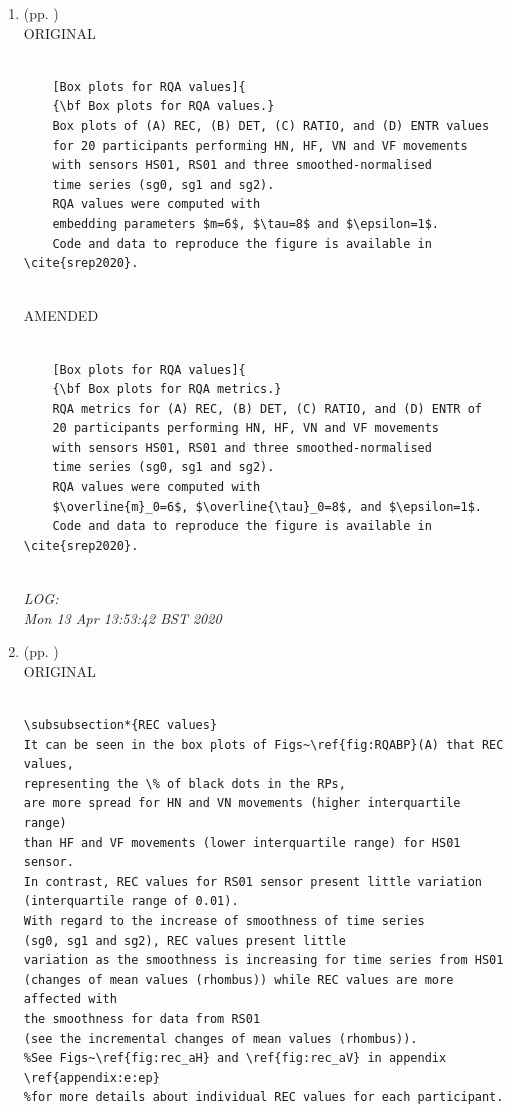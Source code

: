 \documentclass[10pt]{article}
\begin{document}
\begin{enumerate}
\item  (pp. ) \\
ORIGINAL
\begin{verbatim}

	[Box plots for RQA values]{
	{\bf Box plots for RQA values.}
	Box plots of (A) REC, (B) DET, (C) RATIO, and (D) ENTR values 
	for 20 participants performing HN, HF, VN and VF movements
	with sensors HS01, RS01 and three smoothed-normalised  
	time series (sg0, sg1 and sg2).
	RQA values were computed with 
	embedding parameters $m=6$, $\tau=8$ and $\epsilon=1$.
	Code and data to reproduce the figure is available in \cite{srep2020}.
 

\end{verbatim}

AMENDED
\begin{verbatim}

	[Box plots for RQA values]{
	{\bf Box plots for RQA metrics.}
	RQA metrics for (A) REC, (B) DET, (C) RATIO, and (D) ENTR of 
	20 participants performing HN, HF, VN and VF movements
	with sensors HS01, RS01 and three smoothed-normalised  
	time series (sg0, sg1 and sg2).
	RQA values were computed with 
	$\overline{m}_0=6$, $\overline{\tau}_0=8$, and $\epsilon=1$. 
	Code and data to reproduce the figure is available in \cite{srep2020}.
 

\end{verbatim}

\textit{
LOG: \\ 
Mon 13 Apr 13:53:42 BST 2020
}
\\




\item  (pp. ) \\
ORIGINAL
\begin{verbatim}
 
\subsubsection*{REC values}
It can be seen in the box plots of Figs~\ref{fig:RQABP}(A) that REC values, 
representing the \% of black dots in the RPs, 
are more spread for HN and VN movements (higher interquartile range) 
than HF and VF movements (lower interquartile range) for HS01 sensor. 
In contrast, REC values for RS01 sensor present little variation 
(interquartile range of 0.01).
With regard to the increase of smoothness of time series 
(sg0, sg1 and sg2), REC values present little 
variation as the smoothness is increasing for time series from HS01 
(changes of mean values (rhombus)) while REC values are more affected with 
the smoothness for data from RS01 
(see the incremental changes of mean values (rhombus)).
%See Figs~\ref{fig:rec_aH} and \ref{fig:rec_aV} in appendix \ref{appendix:e:ep} 
%for more details about individual REC values for each participant.




\end{verbatim}
\end{enumerate}
\end{document}

